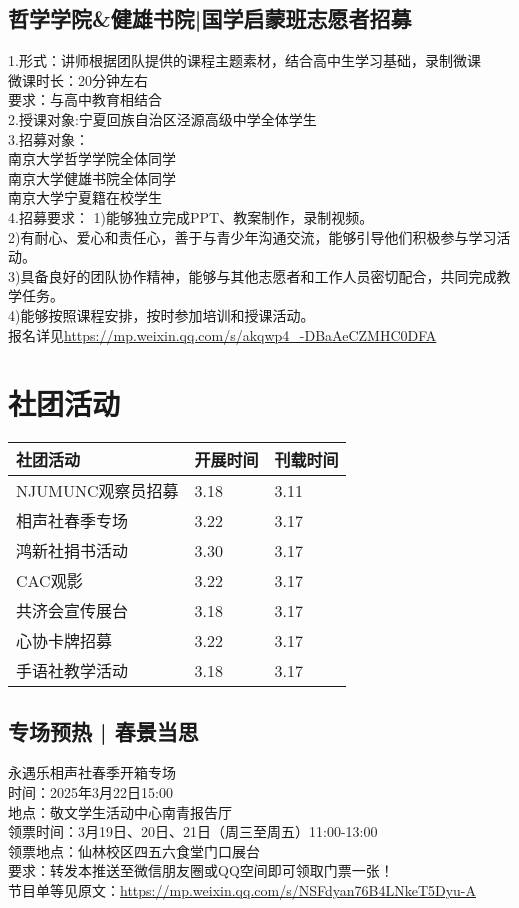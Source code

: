 \documentclass[letterpaper, 12pt]{article}
\begin{document}
\begin{multicols}{2}
\subsection{哲学学院\&健雄书院|国学启蒙班志愿者招募}
1.形式：讲师根据团队提供的课程主题素材，结合高中生学习基础，录制微课\\
微课时长：20分钟左右\\
要求：与高中教育相结合\\
2.授课对象:宁夏回族自治区泾源高级中学全体学生\\
3.招募对象：\\
南京大学哲学学院全体同学\\
南京大学健雄书院全体同学\\
南京大学宁夏籍在校学生\\
4.招募要求：
1)能够独立完成PPT、教案制作，录制视频。\\
2)有耐心、爱心和责任心，善于与青少年沟通交流，能够引导他们积极参与学习活动。\\
3)具备良好的团队协作精神，能够与其他志愿者和工作人员密切配合，共同完成教学任务。\\
4)能够按照课程安排，按时参加培训和授课活动。\\
报名详见\url{https://mp.weixin.qq.com/s/akqwp4_-DBaAeCZMHC0DFA}
\section{社团活动}
\begin{tabular}{|>{\centering\arraybackslash}m{}|m{}|m{}|}
    \hline
    社团活动 & 开展时间 & 刊载时间\\
    \hline\hline
    NJUMUNC观察员招募 & 3.18 & 3.11\\
    相声社春季专场 & 3.22 & 3.17\\
    鸿新社捐书活动 & 3.30 & 3.17\\
    CAC观影 & 3.22 & 3.17\\
    共济会宣传展台 & 3.18 & 3.17\\
    心协卡牌招募 & 3.22 & 3.17\\
    手语社教学活动 & 3.18 & 3.17\\
    \hline
\end{tabular}
\subsection{专场预热 | 春景当思}
永遇乐相声社春季开箱专场\\
时间：2025年3月22日15:00\\
地点：敬文学生活动中心南青报告厅\\
领票时间：3月19日、20日、21日（周三至周五）11:00-13:00\\
领票地点：仙林校区四五六食堂门口展台\\
要求：转发本推送至微信朋友圈或QQ空间即可领取门票一张！\\
节目单等见原文：\url{https://mp.weixin.qq.com/s/NSFdyan76B4LNkeT5Dyu-A}


\end{multicols}
\end{document}
